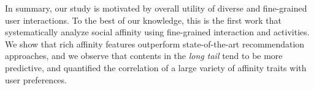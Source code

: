 In summary, our study is motivated by overall utility of diverse and fine-grained user interactions.
To the best of our knowledge, this is the first work that systematically analyze social affinity using
fine-grained interaction and activities.  We show that rich affinity features outperform state-of-the-art
recommendation approaches, and we observe that contents in the {\em long tail} tend to be more predictive,
and quantified the correlation of a large variety of affinity traits with user preferences.

